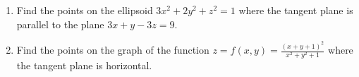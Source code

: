 \documentclass[12pt]{article}
\begin{document}
\begin{enumerate}
   
\item Find the points on the ellipsoid $3x^2+2y^2+z^2=1$ where the tangent plane is parallel to the plane
  $3x+y-3z=9$.\vspace{-2pt}

  
   
\item Find the points on the graph of the function $z=f(x,y)=\frac{(x+y+1)^2}{x^2+y^2+1}$ where the tangent plane is
  horizontal.\vspace{-2pt} 

\end{enumerate}
\end{document}
